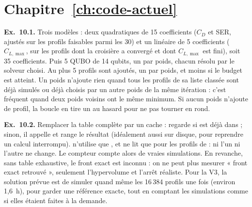 \section*{Chapitre~\ref{ch:code-actuel} }
\textbf{Ex.~10.1.} Trois modèles : deux quadratiques de 15 coefficients ($C_D$ et SER, ajustés sur les profils faisables parmi les 30) et un linéaire de 5 coefficients ($C_{L,\max}$, sur les profils dont la croisière a convergé et dont $C_{L,\max}$ est fini), soit 35 coefficients. Puis 5 QUBO de 14 qubits, un par poids, chacun résolu par le solveur choisi. Au plus 5 profils sont ajoutés, un par poids, et moins si le budget est atteint. Un poids n'ajoute rien quand tous les profils de sa liste classée sont déjà simulés ou déjà choisis par un autre poids de la même itération : c'est fréquent quand deux poids voisins ont le même minimum. Si aucun poids n'ajoute de profil, la boucle en tire un au hasard pour ne pas tourner en rond.

\textbf{Ex.~10.2.} Remplacer la table complète par un cache :  regarde si  est déjà dans  ; sinon, il appelle  et range le résultat (idéalement aussi sur disque, pour reprendre un calcul interrompu).  n'utilise que , et  ne lit  que pour les profils de  : ni l'un ni l'autre ne change. Le compteur compte alors de vraies simulations. En revanche, sans table exhaustive, le front exact est inconnu : on ne peut plus mesurer « front exact retrouvé », seulement l'hypervolume et l'arrêt réaliste. Pour la V3, la solution prévue est de simuler quand même les 16\,384 profils une fois (environ 1,6~h), pour garder une référence exacte, tout en comptant les simulations comme si elles étaient faites à la demande.
